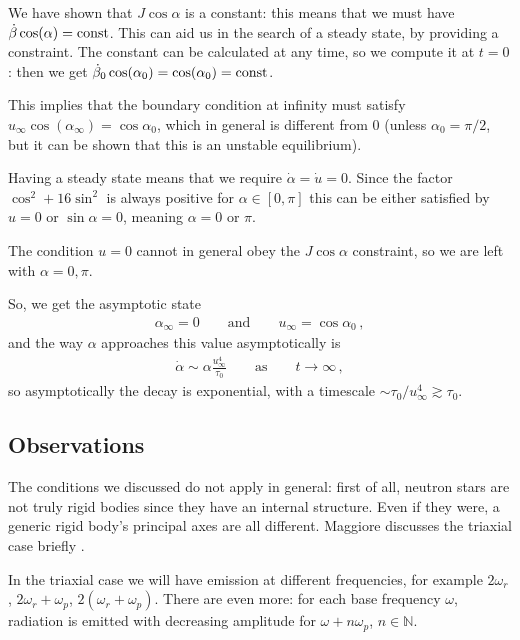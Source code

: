 \documentclass[main.tex]{subfiles}
\begin{document}
We have shown that \(J \cos \alpha \) is a constant: this means that we must have \(\dot{\beta} \cos(\alpha ) = \text{const}\). 
This can aid us in the search of a steady state, by providing a constraint. The constant can be calculated at any time, so we compute it at \(t = 0\): then we get \(\dot{\beta}_{0} \cos(\alpha_0 ) = \cos(\alpha_0 )=  \text{const}\).

This implies that the boundary condition at infinity must satisfy \(u_{ \infty } \cos(\alpha_{ \infty }) = \cos \alpha_0 \), which in general is different from 0 (unless \(\alpha_0 = \pi /2\), but it can be shown that this is an unstable equilibrium).

Having a steady state means that we require \(\dot{\alpha} = \dot{u} = 0\).
Since the factor \(\cos^2 + 16 \sin^2 \) is always positive for \(\alpha \in [0, \pi ]\) this can be either satisfied by \(u = 0\) or \(\sin \alpha = 0\), meaning \(\alpha = 0\) or \(\pi \).

The condition \(u = 0\) cannot in general obey the \(J \cos \alpha \) constraint, so we are left with \(\alpha = 0, \pi \).


So, we get the asymptotic state 
%
\begin{align}
\alpha_{ \infty } = 0 
\qquad \text{and} \qquad
u_{ \infty } = \cos \alpha_0 
\,,
\end{align}
%
and the way \(\alpha \) approaches this value asymptotically is 
%
\begin{align}
\dot{\alpha} \sim \alpha \frac{ u^{4}_{ \infty }  }{\tau_0 }
\qquad \text{as} \qquad
t \to \infty 
\,,
\end{align}
%
so asymptotically the decay is exponential, with a timescale \(\sim \tau_0 / u_{ \infty }^{4} \gtrsim \tau_0 \). 

\subsection{Observations}

The conditions we discussed do not apply in general: first of all, neutron stars are not truly rigid bodies since they have an internal structure. 
Even if they were, a generic rigid body's principal axes are all different. Maggiore discusses the triaxial case briefly \cite[pagg.\ 211--214]{maggioreGravitationalWavesVolume2007}.

In the triaxial case we will have emission at different frequencies, for example \(2 \omega_{r} \), \(2 \omega_{r} + \omega_{p} \), \(2 (\omega_{r} + \omega_{p})\).
There are even more: for each base frequency \(\omega \), radiation is emitted with decreasing amplitude for \(\omega + n \omega_{p}\), \(n \in \mathbb{N}\).
\end{document}
